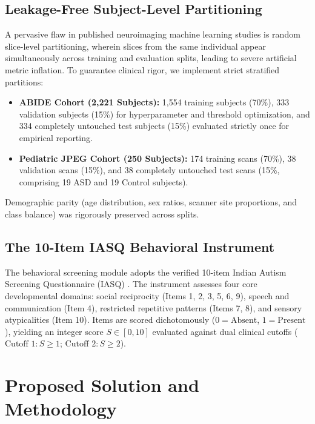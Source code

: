 \documentclass[conference]{IEEEtran}
\begin{document}
\subsection{Leakage-Free Subject-Level Partitioning}
A pervasive flaw in published neuroimaging machine learning studies is random slice-level partitioning, wherein slices from the same individual appear simultaneously across training and evaluation splits, leading to severe artificial metric inflation. To guarantee clinical rigor, we implement strict stratified partitions:
\begin{itemize}
    \item \textbf{ABIDE Cohort (2,221 Subjects):} 1,554 training subjects (70\%), 333 validation subjects (15\%) for hyperparameter and threshold optimization, and 334 completely untouched test subjects (15\%) evaluated strictly once for empirical reporting.
    \item \textbf{Pediatric JPEG Cohort (250 Subjects):} 174 training scans (70\%), 38 validation scans (15\%), and 38 completely untouched test scans (15\%, comprising 19 ASD and 19 Control subjects).
\end{itemize}
Demographic parity (age distribution, sex ratios, scanner site proportions, and class balance) was rigorously preserved across splits.

\subsection{The 10-Item IASQ Behavioral Instrument}
The behavioral screening module adopts the verified 10-item Indian Autism Screening Questionnaire (IASQ) \cite{mukherjee2021indian}. The instrument assesses four core developmental domains: social reciprocity (Items 1, 2, 3, 5, 6, 9), speech and communication (Item 4), restricted repetitive patterns (Items 7, 8), and sensory atypicalities (Item 10). Items are scored dichotomously ($0 = \text{Absent}$, $1 = \text{Present}$), yielding an integer score $S \in [0, 10]$ evaluated against dual clinical cutoffs ($\text{Cutoff 1}: S \ge 1$; $\text{Cutoff 2}: S \ge 2$).

\section{Proposed Solution and Methodology}
\end{document}
